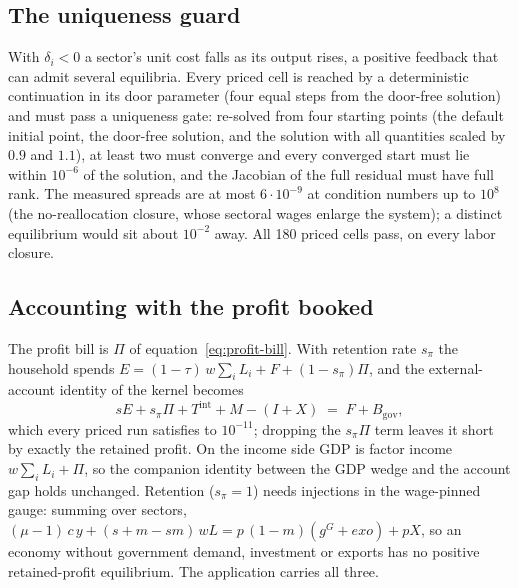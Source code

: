 \subsection{The uniqueness guard}\label{app:pricing-guard}
With $\delta_i < 0$ a sector's unit cost falls as its output rises, a positive
feedback that can admit several equilibria. Every priced cell is reached by a
deterministic continuation in its door parameter (four equal steps from the
door-free solution) and must pass a uniqueness gate: re-solved from four
starting points (the default initial point, the door-free solution, and the
solution with all quantities scaled by $0.9$ and $1.1$), at least two must
converge and every converged start must lie within $10^{-6}$ of the solution,
and the Jacobian of the full residual must have full rank. The measured
spreads are at most $6 \cdot 10^{-9}$ at condition numbers up to $10^{8}$
(the no-reallocation closure, whose sectoral wages enlarge the system); a
distinct equilibrium would sit about $10^{-2}$ away. All 180 priced cells pass,
on every labor closure.

\subsection{Accounting with the profit booked}\label{app:pricing-accounting}
The profit bill is $\Pi$ of equation~\eqref{eq:profit-bill}. With retention
rate $s_\pi$ the household spends
$E = (1-\tau)\,w\textstyle\sum_i L_i + F + (1-s_\pi)\Pi$, and the
external-account identity of the kernel becomes
\begin{equation}\label{eq:app-account}
  sE + s_\pi \Pi + T^{\mathrm{int}} + M - (I + X) \;=\; F + B_{\mathrm{gov}},
\end{equation}
which every priced run satisfies to $10^{-11}$; dropping the $s_\pi\Pi$ term
leaves it short by exactly the retained profit. On the income side GDP is factor
income $w\sum_i L_i + \Pi$, so the companion identity between the GDP wedge and
the account gap holds unchanged. Retention ($s_\pi = 1$) needs injections in
the wage-pinned gauge: summing over sectors,
$(\mu - 1)\,c\,y + (s + m - s m)\,w L = p\,(1-m)(g^G + \mathit{exo}) + pX$, so an
economy without government demand, investment or exports has no positive
retained-profit equilibrium. The application carries all three.
